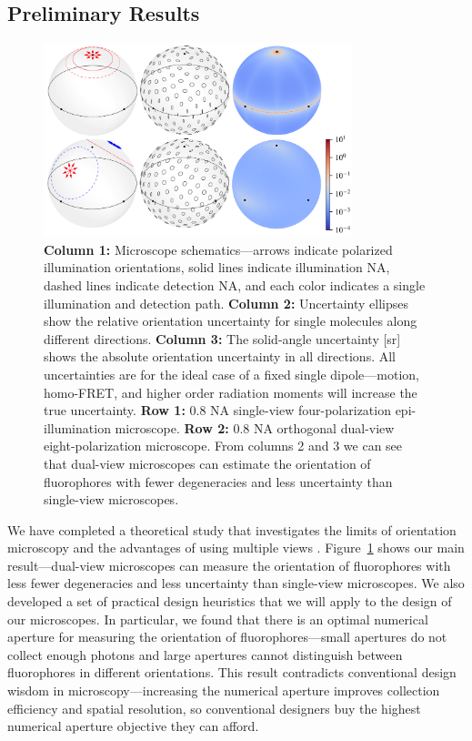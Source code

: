 \documentclass[11pt]{article}
\begin{document}
\subsection*{Preliminary Results}
\begin{figure}[t]
\centering
  \includegraphics[width=0.8\textwidth, interpolate=true, trim={0em 0em 0em 0em}]{figs/proposal-fig}
  \caption{\textbf{Column 1:} Microscope schematics---arrows indicate polarized
    illumination orientations, solid lines indicate illumination NA, dashed
    lines indicate detection NA, and each color indicates a single illumination
    and detection path. \textbf{Column 2:} Uncertainty ellipses show the
    relative orientation uncertainty for single molecules along different
    directions. \textbf{Column 3:} The solid-angle uncertainty [sr] shows the
    absolute orientation uncertainty in all directions. All uncertainties are
    for the ideal case of a fixed single dipole---motion, homo-FRET, and higher
    order radiation moments will increase the true uncertainty. \textbf{Row 1:}
    0.8 NA single-view four-polarization epi-illumination
    microscope. \textbf{Row 2:} 0.8 NA orthogonal dual-view eight-polarization
    microscope. From columns 2 and 3 we can see that dual-view microscopes can
    estimate the orientation of fluorophores with fewer degeneracies and less
    uncertainty than single-view microscopes.}
  \label{fig:comparison}
\end{figure}
We have completed a theoretical study that investigates the limits of
orientation microscopy and the advantages of using multiple views
\cite{chandler17}. Figure~\ref{fig:comparison} shows our main result---dual-view
microscopes can measure the orientation of fluorophores with less fewer
degeneracies and less uncertainty than single-view microscopes. We also
developed a set of practical design heuristics that we will apply to the design
of our microscopes. In particular, we found that there is an optimal numerical
aperture for measuring the orientation of fluorophores---small apertures do not
collect enough photons and large apertures cannot distinguish between
fluorophores in different orientations. This result contradicts conventional
design wisdom in microscopy---increasing the numerical aperture improves
collection efficiency and spatial resolution, so conventional designers buy the
highest numerical aperture objective they can afford.
\end{document}
